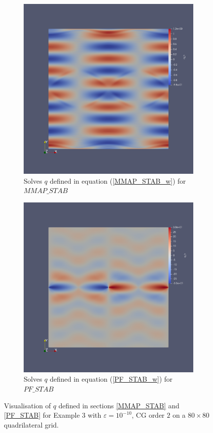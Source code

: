 \documentclass[12pt]{ociamthesis}
\begin{document}
\begin{figure}[H]
 \begin{subfigure}{0.5\textwidth}
     \includegraphics[width=\textwidth]{Pics/ErrorPlots/E3_MMAP_STAB_Q.png}
     \caption{Solves $q$ defined in equation (\ref{MMAP_STAB_w}) for $MMAP\_STAB$}
 \end{subfigure}
   \begin{subfigure}{0.5\textwidth}
     \includegraphics[width=\textwidth]{Pics/ErrorPlots/E3_PF_STAB_Q.png}
     \caption{Solves $q$ defined in equation (\ref{PF_STAB_w}) for $PF\_STAB$}
 \end{subfigure}
 \caption{Visualisation of $q$ defined in sections \ref{MMAP_STAB} and \ref{PF_STAB} for Example $3$ with $\varepsilon = 10^{-10}$, CG order $2$ on a $80 \times 80$ quadrilateral grid.} \label{E3_Q}
\end{figure}
\end{document}
